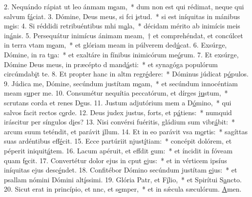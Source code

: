 2. Nequándo rápiat ut leo ánmam m\uline{e}am,~* dum non est qui rédimat, neque qui salvum f\uline{á}ciat.
3. Dómine, Deus meus, si fci \uline{i}stud.~* si est iníquitas in mánibus m\uline{e}is:
4. Si réddidi retribuéntibus mhi m\uline{a}la,~* décidam mérito ab inimícis meis in\uline{á}nis.
5. Persequátur inimícus ánimam meam,~† et comprehéndat, et concúlcet in terra vtam m\uline{e}am,~* et glóriam meam in púlverem ded\uline{ú}cat.
6. Exsúrge, Dómine, in ra t\uline{u}a:~* et exaltáre in fínibus inimicórum me\uline{ó}rum.
7. Et exsúrge, Dómine Deus meus, in præcépto d mand\uline{á}sti:~* et synagóga populórum circúmdab\uline{i}t te.
8. Et propter hanc in altm regr\uline{é}dere:~* Dóminus júdicat p\uline{ó}pulos.
9. Júdica me, Dómine, secúndum justítam m\uline{e}am,~* et secúndum innocéntiam meam s\uline{u}per me.
10. Consumétur nequítia peccatórum, et dírges j\uline{u}stum,~* scrutans corda et renes D\uline{e}us.
11. Justum adjutórium mem a D\uline{ó}mino,~* qui salvos facit rectos c\uline{o}rde.
12. Deus judex justus, forts, et p\uline{á}tiens:~* numquid iráscitur per síngulos d\uline{i}es?
13. Nisi convérsi fuéritis, gládium sum vibr\uline{á}bit:~* arcum suum teténdit, et parávit \uline{i}llum.
14. Et in eo parávit vsa m\uline{o}rtis:~* sagíttas suas ardéntibus eff\uline{é}cit.
15. Ecce partúriit njust\uline{í}tiam:~* concépit dolórem, et péperit iniquit\uline{á}tem.
16. Lacum apéruit, et effdit \uline{e}um:~* et íncidit in fóveam quam f\uline{e}cit.
17. Convertétur dolor ejus in cput \uline{e}jus:~* et in vérticem ipsíus iníquitas ejus desc\uline{é}ndet.
18. Confitébor Dómino secúndum justítam \uline{e}jus:~* et psallam nómini Dómini alt\uline{í}ssimi.
19. Glória Patr, et F\uline{í}lio,~* et Spirítui S\uline{a}ncto.
20. Sicut erat in princípio, et nnc, et s\uline{e}mper,~* et in sǽcula sæculórum. \uline{A}men.
